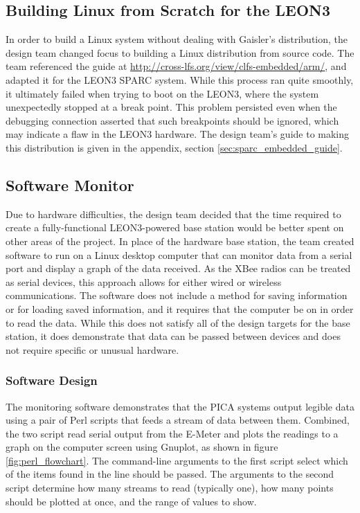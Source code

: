 \subsection{Building Linux from Scratch for the LEON3}
In order to build a Linux system without dealing with Gaisler's
distribution, the design team changed focus to building a Linux
distribution from source code. The team referenced the guide at
\url{http://cross-lfs.org/view/clfs-embedded/arm/}, and adapted it for the
LEON3 SPARC system. While this process ran quite smoothly, it ultimately
failed when trying to boot on the LEON3, where the system unexpectedly
stopped at a break point. This problem persisted even when the debugging
connection asserted that such breakpoints should be ignored, which may
indicate a flaw in the LEON3 hardware. The design team's guide to
making this distribution is given in the appendix, section
\ref{sec:sparc_embedded_guide}.

\subsection{Software Monitor}
Due to hardware difficulties, the design team decided that the time
required to create a fully-functional LEON3-powered base station would be
better spent on other areas of the project. In place of the hardware base
station, the team created software to run on a Linux desktop computer that
can monitor data from a serial port and display a graph of the data
received. As the XBee radios can be treated as serial devices, this
approach allows for either wired or wireless communications. The software
does not include a method for saving information or for loading saved
information, and it requires that the computer be on in order to read the
data. While this does not satisfy all of the design targets for the base
station, it does demonstrate that data can be passed between devices and
does not require specific or unusual hardware.

\subsubsection{Software Design}
The monitoring software demonstrates that the \ac{PICA} systems output
legible data using a pair of Perl scripts that feeds a stream of data
between them. Combined, the two script read serial output from the E-Meter
and plots the readings to a graph on the computer screen using
Gnuplot, as shown in figure \ref{fig:perl_flowchart}. The command-line
arguments to the first script select which of the items found in the
line should be passed. The arguments to the second script determine
how many streams to read (typically one), how many points should be
plotted at once, and the range of values to show.

